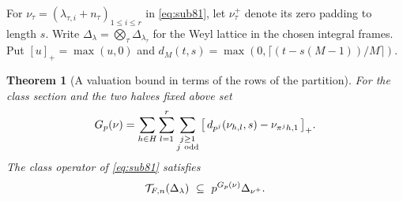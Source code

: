 \documentclass[a4paper,11pt]{article}
\newtheorem{theorem}[proposition]{Theorem}
\theoremstyle{definition}
\theoremstyle{remark}
\numberwithin{equation}{section}
\begin{document}
For \(\nu_\tau=(\lambda_{\tau,i}+n_\tau)_{1\le i\le r}\) in
\eqref{eq:sub81}, let \(\nu_\tau^+\) denote its zero padding to
length \(s\). Write \(\Delta_\lambda=\bigotimes_\tau
\Delta_{\lambda_\tau}\) for the Weyl lattice in the chosen
integral frames. Put \([u]_+=\max(u,0)\) and
\(d_M(t,s)=\max(0,\lceil(t-s(M-1))/M\rceil)\).

\begin{theorem}[A valuation bound in terms of the rows of the partition]\leavevmode
\label{thm:weylrowjet449}
For the class section and the two halves fixed above set
\[
 G_p(\nu)=
 \sum_{h\in H}\sum_{l=1}^r\sum_{\substack{j\ge1\\j\ {\rm odd}}}
 \big[\,d_{p^j}(\nu_{h,l},s)-\nu_{\pi^jh,1}\,\big]_+ .
\]
The class operator of \eqref{eq:sub81} satisfies
\[
             {\cal T}_{F,n}(\Delta_\lambda)
                     \ \subseteq\ p^{G_p(\nu)}\Delta_{\nu^+}.
\]
\end{theorem}
\end{document}
